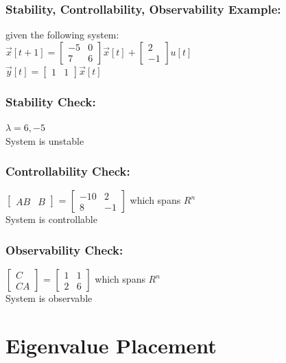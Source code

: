 \documentclass{beamer}
\begin{document}
\begin{frame}
\frametitle{Stability, Controllability, Observability Example:}

given the following system: \\
$\vec{x}[t+1] = 
\begin{bmatrix}
-5 & 0 \\
7 & 6
\end{bmatrix}
\vec{x}[t] + 
\begin{bmatrix}
2 \\
-1
\end{bmatrix}
u[t]$\\
$
\vec{y}[t] =
\begin{bmatrix}
1 & 1
\end{bmatrix}
\vec{x}[t]$
\end{frame}

\begin{frame}
\frametitle{Stability Check:}

$\lambda = 6, -5$\\ \pause
System is unstable
\end{frame}

\begin{frame}
\frametitle{Controllability Check:}

$\begin{bmatrix}
AB & B
\end{bmatrix}$ = 
$\begin{bmatrix}
-10 & 2 \\
8 & -1
\end{bmatrix}$
which spans $R^{n}$ \\ \pause
System is controllable
\end{frame}

\begin{frame}
\frametitle{Observability Check:}

$\begin{bmatrix}
C \\
CA
\end{bmatrix}$ = 
$\begin{bmatrix}
1 & 1 \\
2 & 6
\end{bmatrix}$ 
which spans $R^{n}$ \\ \pause
System is observable
\end{frame}

	\section{Eigenvalue Placement}
\end{document}
